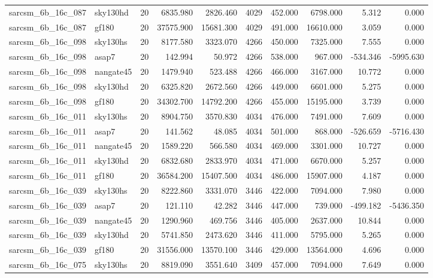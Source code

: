 \begin{tabular}{llrrrrrrrr}
sarcsm\_6b\_16c\_087 & sky130hd & 20 & 6835.980 & 2826.460 & 4029 & 452.000 & 6798.000 & 5.312 & 0.000 \\
sarcsm\_6b\_16c\_087 & gf180 & 20 & 37575.900 & 15681.300 & 4029 & 491.000 & 16610.000 & 3.059 & 0.000 \\
sarcsm\_6b\_16c\_098 & sky130hs & 20 & 8177.580 & 3323.070 & 4266 & 450.000 & 7325.000 & 7.555 & 0.000 \\
sarcsm\_6b\_16c\_098 & asap7 & 20 & 142.994 & 50.972 & 4266 & 538.000 & 967.000 & -534.346 & -5995.630 \\
sarcsm\_6b\_16c\_098 & nangate45 & 20 & 1479.940 & 523.488 & 4266 & 466.000 & 3167.000 & 10.772 & 0.000 \\
sarcsm\_6b\_16c\_098 & sky130hd & 20 & 6325.820 & 2672.560 & 4266 & 449.000 & 6601.000 & 5.275 & 0.000 \\
sarcsm\_6b\_16c\_098 & gf180 & 20 & 34302.700 & 14792.200 & 4266 & 455.000 & 15195.000 & 3.739 & 0.000 \\
sarcsm\_6b\_16c\_011 & sky130hs & 20 & 8904.750 & 3570.830 & 4034 & 476.000 & 7491.000 & 7.609 & 0.000 \\
sarcsm\_6b\_16c\_011 & asap7 & 20 & 141.562 & 48.085 & 4034 & 501.000 & 868.000 & -526.659 & -5716.430 \\
sarcsm\_6b\_16c\_011 & nangate45 & 20 & 1589.220 & 566.580 & 4034 & 469.000 & 3301.000 & 10.727 & 0.000 \\
sarcsm\_6b\_16c\_011 & sky130hd & 20 & 6832.680 & 2833.970 & 4034 & 471.000 & 6670.000 & 5.257 & 0.000 \\
sarcsm\_6b\_16c\_011 & gf180 & 20 & 36584.200 & 15407.500 & 4034 & 486.000 & 15907.000 & 4.187 & 0.000 \\
sarcsm\_6b\_16c\_039 & sky130hs & 20 & 8222.860 & 3331.070 & 3446 & 422.000 & 7094.000 & 7.980 & 0.000 \\
sarcsm\_6b\_16c\_039 & asap7 & 20 & 121.110 & 42.282 & 3446 & 447.000 & 739.000 & -499.182 & -5436.350 \\
sarcsm\_6b\_16c\_039 & nangate45 & 20 & 1290.960 & 469.756 & 3446 & 405.000 & 2637.000 & 10.844 & 0.000 \\
sarcsm\_6b\_16c\_039 & sky130hd & 20 & 5741.850 & 2473.620 & 3446 & 411.000 & 5795.000 & 5.265 & 0.000 \\
sarcsm\_6b\_16c\_039 & gf180 & 20 & 31556.000 & 13570.100 & 3446 & 429.000 & 13564.000 & 4.696 & 0.000 \\
sarcsm\_6b\_16c\_075 & sky130hs & 20 & 8819.090 & 3551.640 & 3409 & 457.000 & 7094.000 & 7.649 & 0.000 \\

\end{tabular}
